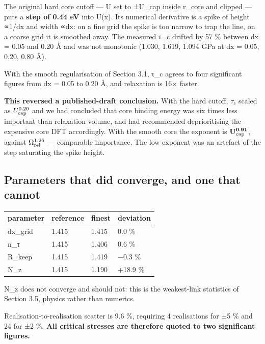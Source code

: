 \documentclass[11pt,a4paper]{article}
\begin{document}
The original hard core cutoff --- U set to ±U\_cap inside r\_core and clipped --- puts a \textbf{step of 0.44 eV} into U(x). Its numerical derivative is a spike of height ∝1/dx and width ∝dx: on a fine grid the spike is too narrow to trap the line, on a coarse grid it is smoothed away. The measured τ\_c drifted by 57 \% between dx = 0.05 and 0.20 Å and was not monotonic (1.030, 1.619, 1.094 GPa at dx = 0.05, 0.20, 0.80 Å).

With the smooth regularisation of Section 3.1, τ\_c agrees to four significant figures from dx = 0.05 to 0.20 Å, and relaxation is 16× faster.

\textbf{This reversed a published-draft conclusion.} With the hard cutoff, \(\tau_c\) scaled as \(U_{\rm cap}^{0.20}\) and we had concluded that core binding energy was six times less important than relaxation volume, and had recommended deprioritising the expensive core DFT accordingly. With the smooth core the exponent is \(\mathbf{U_{\rm cap}^{0.91}}\), against \(\Omega_{\rm rel}^{1.26}\) --- comparable importance. The low exponent was an artefact of the step saturating the spike height.

\hypertarget{parameters-that-did-converge-and-one-that-cannot}{%
\subsection{Parameters that did converge, and one that cannot}\label{sec:parameters-that-did-converge-and-one-that-cannot}}

\begin{longtable}[]{@{}llll@{}}
\toprule\noalign{}
parameter & reference & finest & deviation \\
\midrule\noalign{}
\endhead
\bottomrule\noalign{}
\endlastfoot
dx\_grid & 1.415 & 1.415 & 0.0 \% \\
n\_τ & 1.415 & 1.406 & 0.6 \% \\
R\_keep & 1.415 & 1.419 & −0.3 \% \\
N\_z & 1.415 & 1.190 & +18.9 \% \\
\end{longtable}

N\_z does not converge and should not: this is the weakest-link statistics of Section 3.5, physics rather than numerics.

Realisation-to-realisation scatter is 9.6 \%, requiring 4 realisations for ±5 \% and 24 for ±2 \%. \textbf{All critical stresses are therefore quoted to two significant figures.}
\end{document}
